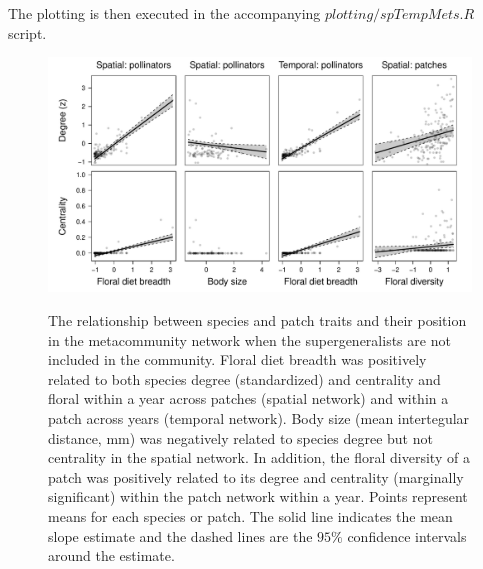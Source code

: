 \documentclass{article}\usepackage[]{graphicx}\usepackage[]{color}
\begin{document}
The plotting is then executed in the accompanying
$plotting/spTempMets.R$ script.

\clearpage

\begin{figure} \centering
\includegraphics[width=1\textwidth]{figure/all_sig_drop_li_htFALSE.pdf}
\label{fig:connectivity} \caption{The relationship between species and
patch traits and their position in the metacommunity network when the
supergeneralists are not included in the community. Floral diet
breadth was positively related to both species degree (standardized)
and centrality and floral within a year across patches (spatial
network) and within a patch across years (temporal network). Body size
(mean intertegular distance, mm) was negatively related to species
degree but not centrality in the spatial network.  In addition, the
floral diversity of a patch was positively related to its degree and
centrality (marginally significant) within the patch network within a
year. Points represent means for each species or patch. The solid line
indicates the mean slope estimate and the dashed lines are the $95\%$
confidence intervals around the estimate.}  \end{figure} \clearpage
\end{document}
